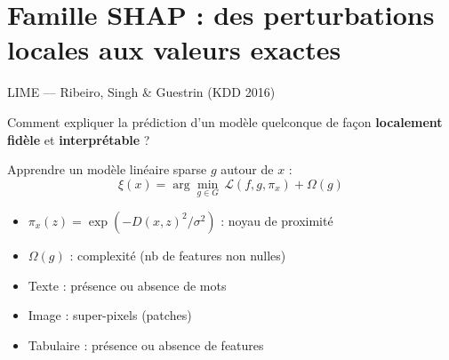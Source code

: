 \documentclass[10pt]{beamer}
\begin{document}
\section{Famille SHAP : des perturbations locales aux valeurs exactes}


\begin{frame}{LIME --- Ribeiro, Singh \& Guestrin (KDD 2016)}
	\begin{minipage}{0.49\textwidth}
		\begin{tcolorbox}[
			colback=blue!3,
			colframe=blue!40!black,
			arc=2mm,
			boxrule=0.5pt,
			fonttitle=\bfseries,
			title={Problème résolu}
			]
			Comment expliquer la prédiction d'un modèle quelconque
			de façon \textbf{localement fidèle} et \textbf{interprétable} ?
		\end{tcolorbox}
		
		\begin{tcolorbox}[
			colback=green!3,
			colframe=green!40!black,
			arc=2mm,
			boxrule=0.5pt,
			fonttitle=\bfseries,
			title={Méthode}
			]
			Apprendre un modèle linéaire sparse $g$ autour de $x$ :
			\vspace{-0.2cm}
			\[
			\xi(x) = \arg\min_{g \in G}\, \mathcal{L}(f, g, \pi_x) + \Omega(g)
			\]
			\vspace{-0.5cm}
			\begin{itemize}
				\item $\pi_x(z) = \exp(-D(x,z)^2/\sigma^2)$ : noyau de proximité
				\item $\Omega(g)$ : complexité (nb de features non nulles)
			\end{itemize}
		\end{tcolorbox}
	\end{minipage}
	\hfill
	\begin{minipage}{0.48\textwidth}
		\begin{tcolorbox}[
			colback=orange!3,
			colframe=orange!50!black,
			arc=2mm,
			boxrule=0.5pt,
			fonttitle=\bfseries,
			title={Représentations interprétables}
			]
			\begin{itemize}
				\item Texte : présence ou absence de mots
				\item Image : super-pixels (patches)
				\item Tabulaire : présence ou absence de features
			\end{itemize}
		\end{tcolorbox}
		

\end{minipage}
\end{frame}
\end{document}
